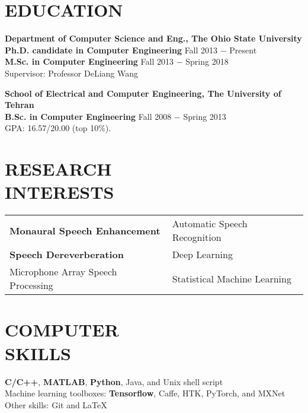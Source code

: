 \documentclass[margin, 10pt]{res}
\begin{document}
\begin{resume}

\section{EDUCATION}
\textbf{Department of Computer Science and Eng., The Ohio State University }  \\
\textbf{Ph.D. candidate in Computer Engineering} \hfill {\footnotesize Fall 2013 $-$ Present} \\
\textbf{M.Sc. in Computer Engineering} \hfill {\footnotesize Fall 2013 $-$ Spring 2018} \\
Supervisor: Professor DeLiang Wang

\textbf{School of Electrical and Computer Engineering, The University of Tehran}\\
\textbf{B.Sc. in Computer Engineering} \hfill {\footnotesize Fall 2008 $-$ Spring 2013} \\
GPA: 16.57/20.00 (top 10\%).


\section{RESEARCH\\INTERESTS}
\begin{tabular}{l l}
\textbf{Monaural Speech Enhancement}    & \hspace{0.3in}   Automatic Speech Recognition\\ 
\textbf{Speech Dereverberation}    & \hspace{0.3in}    Deep Learning\\ 
Microphone Array Speech Processing  & \hspace{0.3in} Statistical Machine Learning
\end{tabular}

\section{COMPUTER \\ SKILLS}
\textbf{C/C++}, \textbf{MATLAB}, \textbf{Python}, Java, and Unix shell script\\
Machine learning toolboxes: \textbf{Tensorflow},
Caffe, HTK, PyTorch, and MXNet\\
Other skills: Git and LaTeX



\end{resume}
\end{document}
